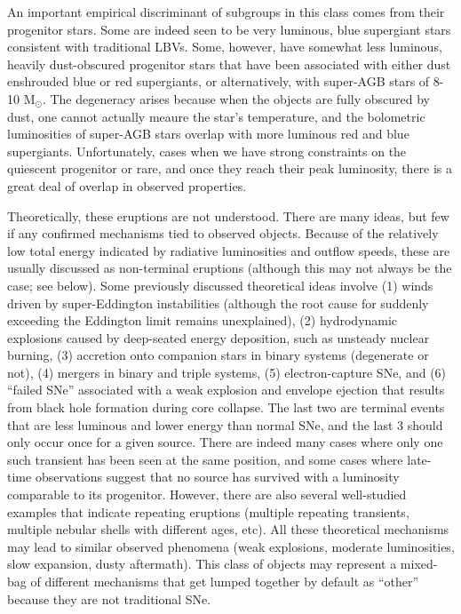 An important empirical discriminant of subgroups in this class comes
from their progenitor stars.  Some are indeed seen to be very
luminous, blue supergiant stars consistent with traditional LBVs.
Some, however, have somewhat less luminous, heavily dust-obscured
progenitor stars that have been associated with either dust enshrouded
blue or red supergiants, or alternatively, with super-AGB stars of
8-10 M$_{\odot}$.  The degeneracy arises because when the objects are
fully obscured by dust, one cannot actually meaure the star's
temperature, and the bolometric luminosities of super-AGB stars
overlap with more luminous red and blue supergiants.  Unfortunately,
cases when we have strong constraints on the quiescent progenitor or
rare, and once they reach their peak luminosity, there is a great deal
of overlap in observed properties.

Theoretically, these eruptions are not understood.  There are many
ideas, but few if any confirmed mechanisms tied to observed
objects. Because of the relatively low total energy indicated by
radiative luminosities and outflow speeds, these are usually discussed
as non-terminal eruptions (although this may not always be the case;
see below).  Some previously discussed theoretical ideas involve (1)
winds driven by super-Eddington instabilities (although the root cause
for suddenly exceeding the Eddington limit remains unexplained), (2)
hydrodynamic explosions caused by deep-seated energy deposition, such
as unsteady nuclear burning, (3) accretion onto companion stars in
binary systems (degenerate or not), (4) mergers in binary and triple
systems, (5) electron-capture SNe, and (6) ``failed SNe'' associated
with a weak explosion and envelope ejection that results from black
hole formation during core collapse.  The last two are terminal events
that are less luminous and lower energy than normal SNe, and the last
3 should only occur once for a given source.  There are indeed many
cases where only one such transient has been seen at the same
position, and some cases where late-time observations suggest that no
source has survived with a luminosity comparable to its progenitor.
However, there are also several well-studied examples that indicate
repeating eruptions (multiple repeating transients, multiple nebular
shells with different ages, etc).  All these theoretical mechanisms
may lead to similar observed phenomena (weak explosions, moderate
luminosities, slow expansion, dusty aftermath). This class of objects
may represent a mixed-bag of different mechanisms that get lumped
together by default as ``other'' because they are not traditional SNe.

